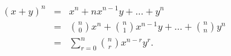 \documentclass[10pt, a4paper]{article}
\begin{document}
\begin{eqnarray}
(x+y)^{n} &=& x^{n} + n x^{n-1}y + ... + y^{n} \\
&=& {n \choose 0} x^{n}+{n \choose 1} x^{n-1}  y + \ldots + {n \choose n} y^{n} \\
&=& \sum_{r=0}^{n} {n \choose r} x^{n-r} y^{r} .
\end{eqnarray}
\end{document}
